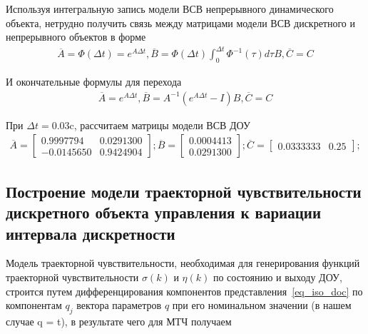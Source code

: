 Используя интегральную запись модели ВСВ непрерывного динамического объекта, нетрудно получить связь между матрицами модели ВСВ дискретного и непрерывного объектов в форме
\begin{align}
	\overline{A} = \Phi (\Delta t) = e^{A \Delta t},
	\overline{B} = \Phi (\Delta t) \int_0^{\Delta t} \Phi^{-1} (\tau) d \tau B,
	\overline{C} = C
\end{align}

И окончательные формулы для перехода
\begin{align}
	\overline{A} = e^{A \Delta t},
	\overline{B} = A^{-1} (e^{A \Delta t} - I)B,
	\overline{C} = C  
\end{align}

При $\Delta t = 0.03$c, рассчитаем матрицы модели ВСВ ДОУ
\begin{align*}
	\overline{A} =
	\begin{bmatrix}
		0.9997794 &   0.0291300\\  
		- 0.0145650  &  0.9424904 
	\end{bmatrix};
	\overline{B} =
	\begin{bmatrix}
		0.0004413 \\
		0.0291300 
	\end{bmatrix};
	\overline{C} =
	\begin{bmatrix}
		 0.0333333  &  0.25 
	\end{bmatrix};
\end{align*}

\subsection{Построение модели траекторной чувствительности дискретного объекта управления к вариации интервала дискретности}

Модель траекторной чувствительности, необходимая для генерирования функций траекторной чувствительности $\sigma(k)$ и $\eta(k)$ по состоянию и выходу ДОУ, строится путем дифференцирования компонентов представления~\ref{eq_iso_doc} по компонентам $q_j$ вектора параметров $q$ при его номинальном значении (в нашем случае q = \Delta t), в результате чего для МТЧ получаем

